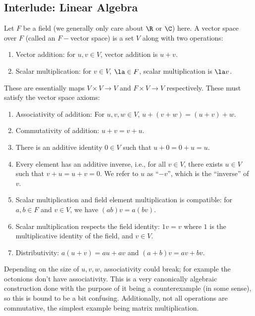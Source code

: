 \subsection{Interlude: Linear Algebra}
Let \(F\) be a field (we generally only care about \(\R\) or \(\C\)) here. A vector space over \(F\) (called an \(F-\)vector space) is a set \(V\) along with two operations:
\begin{enumerate}
    \item Vector addition: for \(u,v\in V\), vector addition is \(u+v\).
    
    \item Scalar multiplication: for \(v\in V\), \(\la\in F\), scalar multiplication is \(\la v\).
\end{enumerate}
These are essentially maps \(V\times V\to V\) and \(F\times V\to V\) respectively. These must satisfy the vector space axioms:
\begin{enumerate}
    \item Associativity of addition: For \(u,v,w\in V\), \(u+(v+w)=(u+v)+w\).
    
    \item Commutativity of addition: \(u+v=v+u\).
    
    \item There is an additive identity \(0\in V\) such that \(u+0=0+u=u\).
    
    \item Every element has an additive inverse, i.e., for all \(v\in V\), there exists \(u\in V\) such that \(v+u=u+v=0\). We refer to \(u\) as ``\(-v\)'', which is the ``inverse'' of \(v\).
    
    \item Scalar multiplication and field element multiplication is compatible: for \(a,b\in F\) and \(v\in V\), we have \((ab)v=a(bv)\).
    
    \item Scalar multiplication respects the field identity: \(1v=v\) where \(1\) is the multiplicative identity of the field, and \(v\in V\).
    
    \item Distributivity: \(a(u+v)=au+av\) and \((a+b)v=av+bv\).
\end{enumerate}
Depending on the size of \(u,v,w\), associativity could break; for example the octonions don't have associativity. This is a very canonically algebraic construction done with the purpose of it being a counterexample (in some sense), so this is bound to be a bit confusing. Additionally, not all operations are commutative, the simplest example being matrix multiplication.


